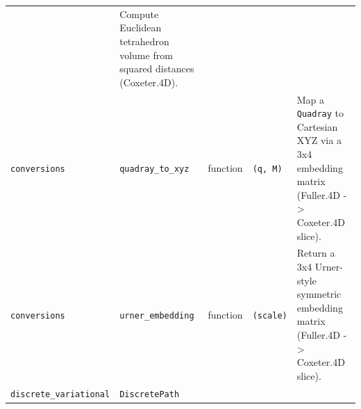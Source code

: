 \documentclass[
  10pt,
]{article}
\begin{document}
\begin{longtable}[]{@{}lllll@{}}
\begin{minipage}[t]{0.17\columnwidth}
\end{minipage} & \begin{minipage}[t]{0.17\columnwidth}\raggedright
Compute Euclidean tetrahedron volume from squared distances
(Coxeter.4D).\strut
\end{minipage}\tabularnewline
\begin{minipage}[t]{0.17\columnwidth}\raggedright
\texttt{conversions}\strut
\end{minipage} & \begin{minipage}[t]{0.17\columnwidth}\raggedright
\texttt{quadray\_to\_xyz}\strut
\end{minipage} & \begin{minipage}[t]{0.17\columnwidth}\raggedright
function\strut
\end{minipage} & \begin{minipage}[t]{0.17\columnwidth}\raggedright
\texttt{(q,\ M)}\strut
\end{minipage} & \begin{minipage}[t]{0.17\columnwidth}\raggedright
Map a \texttt{Quadray} to Cartesian XYZ via a 3x4 embedding matrix
(Fuller.4D -\textgreater{} Coxeter.4D slice).\strut
\end{minipage}\tabularnewline
\begin{minipage}[t]{0.17\columnwidth}\raggedright
\texttt{conversions}\strut
\end{minipage} & \begin{minipage}[t]{0.17\columnwidth}\raggedright
\texttt{urner\_embedding}\strut
\end{minipage} & \begin{minipage}[t]{0.17\columnwidth}\raggedright
function\strut
\end{minipage} & \begin{minipage}[t]{0.17\columnwidth}\raggedright
\texttt{(scale)}\strut
\end{minipage} & \begin{minipage}[t]{0.17\columnwidth}\raggedright
Return a 3x4 Urner-style symmetric embedding matrix (Fuller.4D
-\textgreater{} Coxeter.4D slice).\strut
\end{minipage}\tabularnewline
\begin{minipage}[t]{0.17\columnwidth}\raggedright
\texttt{discrete\_variational}\strut
\end{minipage} & \begin{minipage}[t]{0.17\columnwidth}\raggedright
\texttt{DiscretePath}\strut
\end{minipage} & \begin{minipage}[t]{0.17\columnwidth}\raggedright

\end{minipage}
\end{longtable}
\end{document}
